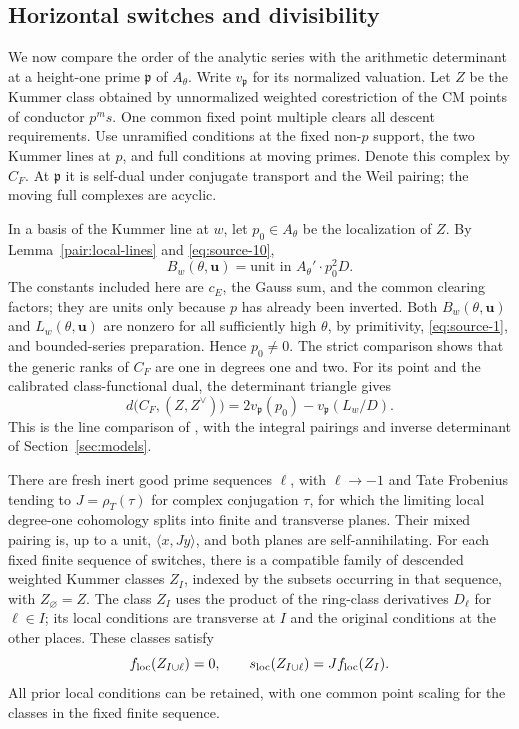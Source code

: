 \subsection{Horizontal switches and divisibility}

We now compare the order of the analytic series with the arithmetic
determinant at a height-one prime \(\mathfrak p\) of \(A_\theta\).
Write \(v_{\mathfrak p}\) for its normalized valuation.
Let \(Z\) be the Kummer class obtained by unnormalized weighted
corestriction of the CM points of conductor \(p^ms\).
One common fixed point multiple clears all descent requirements.
Use unramified conditions at the fixed non-\(p\) support, the two
Kummer lines at \(p\), and full conditions at moving primes.
Denote this complex by \(C_F\).  At \(\mathfrak p\) it is self-dual
under conjugate transport and the Weil pairing; the moving full
complexes are acyclic.

In a basis of the Kummer line at \(w\), let \(p_0\in A_\theta\)
be the localization of \(Z\).  By
Lemma~\ref{pair:local-lines} and \eqref{eq:source-10},
\[
 B_w(\theta,\mathbf u)
      =\text{unit in }A_\theta'\cdot p_0^2D.
\]
The constants included here are \(c_E\), the Gauss sum, and the
common clearing factors; they are units only because \(p\) has
already been inverted.  Both \(B_w(\theta,\mathbf u)\) and
\(L_w(\theta,\mathbf u)\) are nonzero for all sufficiently high
\(\theta\), by primitivity, \eqref{eq:source-1}, and bounded-series
preparation.  Hence \(p_0\ne0\).  The strict comparison shows that
the generic ranks of \(C_F\) are one in degrees one and two.
For its point and the calibrated class-functional dual, the
determinant triangle gives
\begin{equation}
 d\bigl(C_F,(Z,Z^\vee)\bigr)
     =2v_{\mathfrak p}(p_0)
           -v_{\mathfrak p}(L_w/D).
 \tag{16}\label{eq:source-16}
\end{equation}
This is the line comparison of
\cite[Section~3, equation (D)]{B}, with the integral
pairings and inverse determinant of Section~\ref{sec:models}.

\begin{lemma}\label{pair:derivatives}
There are fresh inert good prime sequences \(\ell\), with
\(\ell\to-1\) and Tate Frobenius tending to
\(J=\rho_T(\tau)\) for complex conjugation \(\tau\), for which
the limiting local degree-one cohomology splits into finite and
transverse planes.  Their mixed pairing is, up to a unit,
\(\langle x,Jy\rangle\), and both planes are self-annihilating.
For each fixed finite sequence of switches, there is a compatible
family of descended weighted Kummer classes \(Z_I\), indexed by
the subsets occurring in that sequence, with \(Z_\varnothing=Z\).
The class \(Z_I\) uses the product of the ring-class derivatives
\(D_\ell\) for \(\ell\in I\); its local conditions are transverse
at \(I\) and the original conditions at the other places.
These classes satisfy
\[
 f_{\rm loc}(Z_{I\cup\ell})=0,\qquad
 s_{\rm loc}(Z_{I\cup\ell})=Jf_{\rm loc}(Z_I).
\]
All prior local conditions can be retained, with one common point
scaling for the classes in the fixed finite sequence.
\end{lemma}

